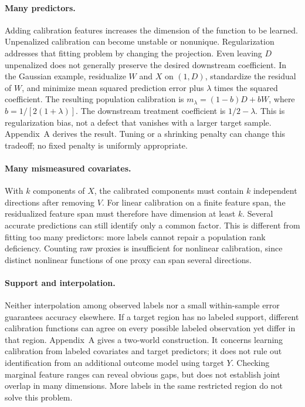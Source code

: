 \documentclass[11pt]{article}
\begin{document}
\paragraph{Many predictors.}
Adding calibration features increases the dimension of the function to be learned. Unpenalized calibration can become unstable or nonunique. Regularization addresses that fitting problem by changing the projection. Even leaving $D$ unpenalized does not generally preserve the desired downstream coefficient. In the Gaussian example, residualize $W$ and $X$ on $(1,D)$, standardize the residual of $W$, and minimize mean squared prediction error plus $\lambda$ times the squared coefficient. The resulting population calibration is $m_\lambda=(1-b)D+bW$, where $b=1/[2(1+\lambda)]$. The downstream treatment coefficient is $1/2-\lambda$. This is regularization bias, not a defect that vanishes with a larger target sample. Appendix~A derives the result. Tuning or a shrinking penalty can change this tradeoff; no fixed penalty is uniformly appropriate.

\paragraph{Many mismeasured covariates.}
With $k$ components of $X$, the calibrated components must contain $k$ independent directions after removing $V$. For linear calibration on a finite feature span, the residualized feature span must therefore have dimension at least $k$. Several accurate predictions can still identify only a common factor. This is different from fitting too many predictors: more labels cannot repair a population rank deficiency. Counting raw proxies is insufficient for nonlinear calibration, since distinct nonlinear functions of one proxy can span several directions.

\paragraph{Support and interpolation.}
Neither interpolation among observed labels nor a small within-sample error guarantees accuracy elsewhere. If a target region has no labeled support, different calibration functions can agree on every possible labeled observation yet differ in that region. Appendix~A gives a two-world construction. It concerns learning calibration from labeled covariates and target predictors; it does not rule out identification from an additional outcome model using target $Y$. Checking marginal feature ranges can reveal obvious gaps, but does not establish joint overlap in many dimensions. More labels in the same restricted region do not solve this problem.
\end{document}
